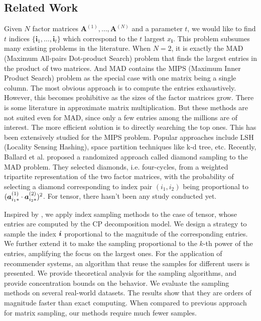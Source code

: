 \documentclass[letterpaper]{article}
\newcommand{\V}[1]{{\boldsymbol{{\MakeLowercase{#1}}}}}
\newcommand{\Varow}[1]{\V{a}^{(#1)}_{i_#1*}}
\begin{document}
\subsection{Related Work}
Given $N$ factor matrices $\textbf{A}^{(1)},\ldots,\textbf{A}^{(N)}$ and a parameter $t$, 
we would like to find $t$ indices $\{\boldsymbol{i}_1,\ldots,\boldsymbol{i}_t\}$ 
which correspond to the $t$ largest $x_{\boldsymbol{i}}$.
This problem subsumes many existing problems in the literature.
When $N=2$, it is exactly the MAD (Maximum All-pairs Dot-product Search)\cite{BaPiKoSe15} problem 
that finds the largest entries in the product of two matrices. 
And MAD contains the MIPS (Maximum Inner Product Search)\cite{Cohen97} problem 
as the special case with one matrix being a single column.
The most obvious approach is to compute the entries exhaustively. 
However, this becomes prohibitive as the sizes of the factor matrices grow. 
There is some literature in approximate matrix multiplication. 
But these methods are not suited even for MAD, 
since only a few entries among the millions are of interest. 
The more efficient solution is to directly searching the top ones. 
This has been extensively studied for the MIPS problem. 
Popular approaches include LSH (Locality Sensing Hashing), 
space partition techniques like k-d tree, etc. 
Recently, Ballard et al. proposed a randomized approach called diamond sampling to the MAD problem. 
They selected diamonds, i.e. four-cycles, from a weighted tripartite representation of the two factor matrices, 
with the probability of selecting a diamond corresponding to index pair $(i_1,i_2)$ being proportional to $(\Varow{1}\cdot\Varow{2})^2$.
For tensor, there hasn't been any study conducted yet.

Inspired by \cite{BaPiKoSe15}, 
we apply index sampling methods to the case of tensor, 
whose entries are computed by the CP decomposition model. 
We design a strategy to sample the index $\V{i}$ proportional to the magnitude of the corresponding entries. 
We further extend it to make the sampling proportional to the $k$-th power of the entries,
amplifying the focus on the largest ones. 
For the application of recommender systems, 
an algorithm that reuse the samples for different users is presented. 
We provide theoretical analysis for the sampling algorithms, 
and provide concentration bounds on the behavior. 
We evaluate the sampling methods on several real-world datasets. 
The results show that they are orders of magnitude faster than exact computing. 
When compared to previous approach for matrix sampling, our methods require much fewer samples.
\end{document}

